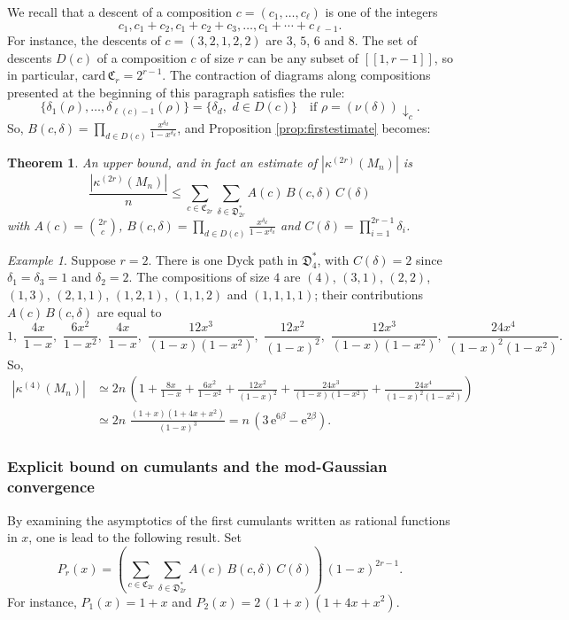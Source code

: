 \documentclass[12pt,a4paper,reqno]{amsart}
\newcommand{\E}{\mathrm{e}}
\newcommand{\cym}{\mathfrak{C}}
\newcommand{\dym}{\mathfrak{D}}
\newcommand{\lle}{\left[\!\left[}
\newcommand{\rre}{\right]\!\right]}
\newtheorem{theorem}{Theorem}
\theoremstyle{remark}
\newtheorem*{example}{Example}
\begin{document}
We recall that a descent of a composition $c=(c_1,\ldots,c_\ell)$ is one of the integers $$c_1, c_1+c_2, c_1+c_2+c_3,\ldots,c_1+\cdots+c_{\ell-1}.$$ For instance, the descents of $c=(3,2,1,2,2)$ are $3$, $5$, $6$ and $8$. The set of descents $D(c)$ of a composition $c$ of size $r$ can be any subset of $\lle 1,r-1\rre$, so in particular, $\mathrm{card}\,\cym_r=2^{r-1}$. The contraction of diagrams along compositions presented at the beginning of this paragraph satisfies the rule:
$$\{\delta_1(\rho),\ldots,\delta_{\ell(c)-1}(\rho)\}=\{\delta_d,\,\,d \in D(c)\} \quad \text{if }\rho=(\nu(\delta))\!\downarrow_c.$$
So, $B(c,\delta)=\prod_{d \in D(c)} \frac{x^{\delta_d}}{1-x^{\delta_d}}$, and Proposition \ref{prop:firstestimate} becomes:

\begin{theorem}
An upper bound, and  in fact an estimate of $|\kappa^{(2r)}(M_n)|$ is
$$\frac{|\kappa^{(2r)}(M_n)|}{n}\leq\sum_{c \in \cym_{2r}} \sum_{\delta \in \dym_{2r}^*} A(c)\,B(c,\delta)\,C(\delta)$$
with $A(c)=\binom{2r}{c}$, $B(c,\delta)=\prod_{d \in D(c)}\frac{x^{\delta_d}}{1-x^{\delta_d}}$ and $C(\delta)=\prod_{i=1}^{2r-1}\delta_i$.
\end{theorem}\bigskip

\begin{example}
Suppose $r=2$. There is one Dyck path in $\dym_4^*$, with $C(\delta)=2$ since $\delta_1=\delta_3=1$ and $\delta_2=2$. The compositions of size $4$ are $(4)$, $(3,1)$, $(2,2)$, $(1,3)$, $(2,1,1)$, $(1,2,1)$, $(1,1,2)$ and $(1,1,1,1)$; their contributions $A(c)\,B(c,\delta)$ are equal to
$$1,\,\,\frac{4x}{1-x},\,\,\frac{6x^2}{1-x^2},\,\,\frac{4x}{1-x},\,\,\frac{12x^3}{(1-x)(1-x^2)},\,\,\frac{12x^2}{(1-x)^2},\,\,\frac{12x^3}{(1-x)(1-x^2)},\,\,\frac{24x^4}{(1-x)^2(1-x^2)}.$$
So,
\begin{align*}|\kappa^{(4)}(M_n)| &\simeq 2n\,\left(1+\frac{8x}{1-x}+\frac{6x^2}{1-x^2}+\frac{12x^2}{(1-x)^2}+\frac{24x^3}{(1-x)(1-x^2)}+\frac{24x^4}{(1-x)^2(1-x^2)}\right)\\
&\simeq 2n \,\,\frac{(1+x)(1+4x+x^2)}{(1-x)^3}=n\,(3\,\E^{6\beta}-\E^{2\beta}).
\end{align*}
\end{example}



\subsubsection{Explicit bound on cumulants and the mod-Gaussian convergence}
By examining the asymptotics of the first cumulants written as rational functions in $x$, one is lead to the following result. Set 
$$P_r(x) = \left(\sum_{c \in \cym_{2r}} \sum_{\delta \in \dym_{2r}^*} A(c)\,B(c,\delta)\,C(\delta)\right)\,(1-x)^{2r-1}.$$
For instance, $P_1(x)=1+x$ and $P_2(x)=2\,(1+x)(1+4x+x^2)$. 
\end{document}
